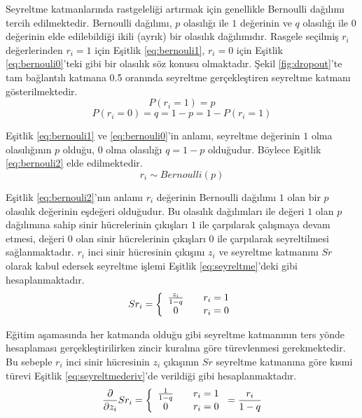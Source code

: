 Seyreltme katmanlarında rastgeleliği artırmak için genellikle Bernoulli dağılımı tercih edilmektedir. Bernoulli dağılımı, $p$ olasılığı ile $1$ değerinin ve $q$ olasılığı ile $0$ değerinin elde edilebildiği ikili (ayrık) bir olasılık dağılımıdır. Rasgele seçilmiş $r_{i}$ değerlerinden $r_{i}=1$ için Eşitlik \ref{eq:bernouli1}, $r_{i}=0$ için Eşitlik \ref{eq:bernouli0}'teki gibi bir olasılık söz konusu olmaktadır. Şekil \ref{fig:dropout}'te tam bağlantılı katmana 0.5 oranında seyreltme gerçekleştiren seyreltme katmanı gösterilmektedir.
\begin{equation}
	\label{eq:bernouli1}
	P(r_{i}=1) = p
\end{equation}
\vspace{-1cm}
\begin{equation}
	\label{eq:bernouli0}
	P(r_{i}=0) = q = 1 - p = 1 - P(r_{i}=1)
\end{equation}

Eşitlik \ref{eq:bernouli1} ve \ref{eq:bernouli0}'in anlamı, seyreltme değerinin $1$ olma olasılığının $p$ olduğu, $0$ olma olasılığı $q = 1 - p$ olduğudur. Böylece Eşitlik \ref{eq:bernouli2} elde edilmektedir.
\begin{equation}
	\label{eq:bernouli2}
	r_{i} \sim \textit{Bernoulli}(p)
\end{equation}

Eşitlik \ref{eq:bernouli2}'nın anlamı $r_{i}$ değerinin Bernoulli dağılımı $1$ olan bir $p$ olasılık değerinin eşdeğeri olduğudur. Bu olasılık dağılımları ile değeri $1$ olan $p$ dağılımına sahip sinir hücrelerinin çıkışları $1$ ile çarpılarak çalışmaya devam etmesi, değeri 0 olan sinir hücrelerinin çıkışları 0 ile çarpılarak seyreltilmesi sağlanmaktadır. $r_{i}$ inci sinir hücresinin çıkışını $z_{i}$ ve seyreltme katmanını $Sr$ olarak kabul edersek seyreltme işlemi Eşitlik \ref{eq:seyreltme}'deki gibi hesaplanmaktadır.
\begin{equation}
	\label{eq:seyreltme}
	Sr_{i} =  \left\{ 
	\begin{array}{ c l }
		\frac{z_{i}}{1-q} & \quad r_{i} = 1 \\
		0                 & \quad r_{i} = 0 
	\end{array}
	\right.
\end{equation}

Eğitim aşamasında her katmanda olduğu gibi seyreltme katmanının ters yönde hesaplaması gerçekleştirilirken zincir kuralına göre türevlenmesi gerekmektedir. Bu sebeple $r_{i}$ inci sinir hücresinin $z_{i}$ çıkışının $Sr$ seyreltme katmanına göre kısmi türevi Eşitlik \ref{eq:seyreltmederiv}'de verildiği gibi hesaplanmaktadır.
\begin{equation}
	\label{eq:seyreltmederiv}
	\frac{\partial}{\partial z_{i}}Sr_{i} =  \left\{ 
	\begin{array}{ c l }
		\frac{1}{1-q} & \quad r_{i} = 1 \\
		0                 & \quad r_{i} = 0 
	\end{array}
	\right. = \frac{r_{i}}{1-q}
\end{equation} 

